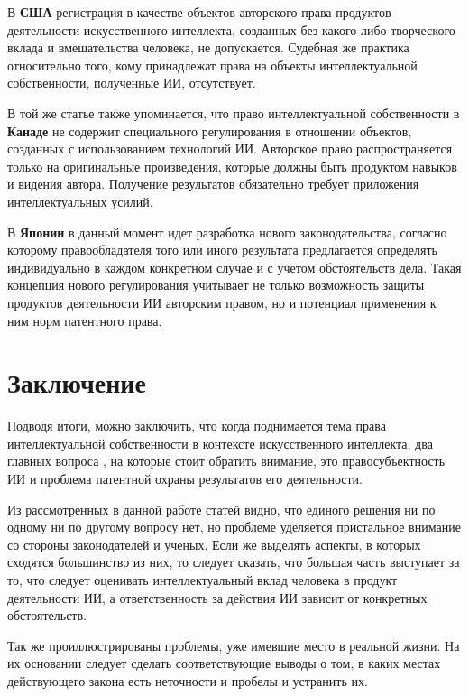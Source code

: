 В \textbf{США} регистрация в качестве объектов авторского права продуктов деятельности
искусственного интеллекта, созданных без какого-либо творческого вклада и вмешательства человека, не
допускается. Судебная же практика относительно того, кому принадлежат права на объекты интеллектуальной
собственности, полученные ИИ, отсутствует.

В той же статье \cite{abr} также упоминается, что право интеллектуальной собственности в \textbf{Канаде}
не содержит специального регулирования в отношении объектов, созданных с использованием технологий
ИИ. Авторское право распространяется только на оригинальные произведения, которые должны быть
продуктом навыков и видения автора. Получение результатов обязательно требует приложения интеллектуальных
усилий.

В \textbf{Японии} в данный момент идет разработка нового законодательства, согласно которому правообладателя
того или иного результата предлагается определять индивидуально в каждом конкретном случае и с учетом
обстоятельств дела. Такая концепция нового регулирования учитывает не только возможность защиты
продуктов деятельности ИИ авторским правом, но и потенциал применения к ним норм патентного права.

\newpage

\section{Заключение}
Подводя итоги, можно заключить, что когда поднимается тема права интеллектуальной собственности
в контексте искусственного интеллекта, два главных вопроса , на которые стоит обратить внимание,
это правосубъектность ИИ и проблема патентной охраны результатов его деятельности.

Из рассмотренных в данной работе статей видно, что единого решения ни по одному ни по другому вопросу нет,
но проблеме уделяется пристальное внимание со стороны законодателей и ученых. Если же выделять аспекты, в
которых сходятся большинство из них, то следует сказать, что большая часть выступает за то, что
следует оценивать интеллектуальный вклад человека в продукт деятельности ИИ, а ответственность за действия ИИ
зависит от конкретных обстоятельств.

Так же проиллюстрированы проблемы, уже имевшие место в реальной жизни. На их основании следует сделать
соответствующие выводы о том, в каких местах действующего закона есть неточности и пробелы и устранить их.
\newpage

